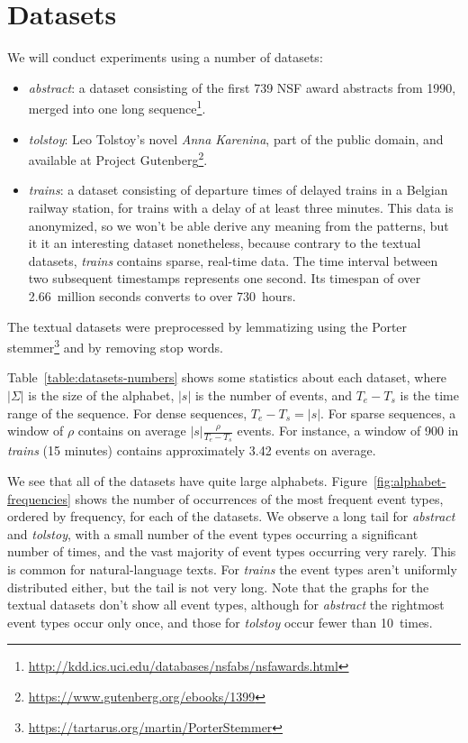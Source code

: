 \section{Datasets}

We will conduct experiments using a number of datasets:

\begin{itemize}
\item \emph{abstract}: a dataset consisting of the first 739 NSF award abstracts from 1990, merged into one long sequence\footnote{\url{http://kdd.ics.uci.edu/databases/nsfabs/nsfawards.html}}.
\item \emph{tolstoy}: Leo Tolstoy's novel \emph{Anna Karenina}, part of the public domain, and available at Project Gutenberg\footnote{\url{https://www.gutenberg.org/ebooks/1399}}.
\item \emph{trains}: a dataset consisting of departure times of delayed trains in a Belgian railway station, for trains with a delay of at least three minutes. This data is anonymized, so we won't be able derive any meaning from the patterns, but it it an interesting dataset nonetheless, because contrary to the textual datasets, \emph{trains} contains sparse, real-time data. The time interval between two subsequent timestamps represents one second. Its timespan of over 2.66~million seconds converts to over 730~hours.
\end{itemize}

The textual datasets were preprocessed by lemmatizing using the Porter stemmer\footnote{\url{https://tartarus.org/martin/PorterStemmer}} and by removing stop words.

Table~\ref{table:datasets-numbers} shows some statistics about each dataset, where $ | \Sigma | $ is the size of the alphabet, $ | s | $ is the number of events, and $ T_e - T_s $ is the time range of the sequence. For dense sequences, $ T_e - T_s = | s | $. For sparse sequences, a window of $ \rho $ contains on average $ | s | \frac\rho{T_e - T_s} $ events. For instance, a window of 900 in \emph{trains} (15 minutes) contains approximately 3.42 events on average.

We see that all of the datasets have quite large alphabets. Figure~\ref{fig:alphabet-frequencies} shows the number of occurrences of the most frequent event types, ordered by frequency, for each of the datasets. We observe a long tail for \emph{abstract} and \emph{tolstoy}, with a small number of the event types occurring a significant number of times, and the vast majority of event types occurring very rarely. This is common for natural-language texts. For \emph{trains} the event types aren't uniformly distributed either, but the tail is not very long. Note that the graphs for the textual datasets don't show all event types, although for \emph{abstract} the rightmost event types occur only once, and those for \emph{tolstoy} occur fewer than 10~times.

